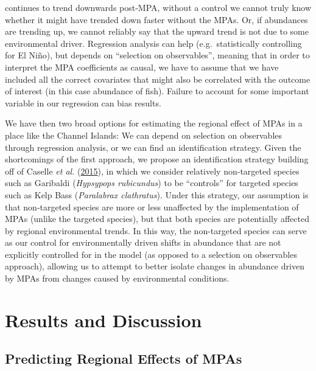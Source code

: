 \documentclass[twoside,12pt,final]{ucthesis-CA2012}
\begin{document}
\begin{ucmainmatter}
continues to trend downwards post-MPA, without a control we cannot truly
know whether it might have trended down faster without the MPAs. Or, if
abundances are trending up, we cannot reliably say that the upward trend
is not due to some environmental driver. Regression analysis can help
(e.g.~statistically controlling for El Niño), but depends on ``selection
on observables'', meaning that in order to interpret the MPA
coefficients as causal, we have to assume that we have included all the
correct covariates that might also be correlated with the outcome of
interest (in this case abundance of fish). Failure to account for some
important variable in our regression can bias results.

We have then two broad options for estimating the regional effect of
MPAs in a place like the Channel Islands: We can depend on selection on
observables through regression analysis, or we can find an
identification strategy. Given the shortcomings of the first approach,
we propose an identification strategy building off of Caselle \emph{et
al.} (\protect\hyperlink{ref-Caselle2015}{2015}), in which we consider
relatively non-targeted species such as Garibaldi (\emph{Hypsypops
rubicundus}) to be ``controls'' for targeted species such as Kelp Bass
(\emph{Paralabrax clathratus}). Under this strategy, our assumption is
that non-targeted species are more or less unaffected by the
implementation of MPAs (unlike the targeted species), but that both
species are potentially affected by regional environmental trends. In
this way, the non-targeted species can serve as our control for
environmentally driven shifts in abundance that are not explicitly
controlled for in the model (as opposed to a selection on observables
approach), allowing us to attempt to better isolate changes in abundance
driven by MPAs from changes caused by environmental conditions.

\section{Results and Discussion}\label{results-and-discussion}

\subsection{Predicting Regional Effects of
MPAs}\label{predicting-regional-effects-of-mpas}


\end{ucmainmatter}
\end{document}

